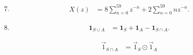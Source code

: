 \begin{enumerate}[label=\thesubsection.\arabic*, ref=\thesubsection.\theenumi, leftmargin=12mm, itemsep=4pt]
    \setcounter{enumi}{6}
    \item[\ref{question-short:C10-Q22}]
    \begin{align}
        X(z) &= 8\sum_{n=0}^{59} z^{-n}
        + 2\sum_{n=0}^{59} n z^{-n}.
        \label{formula:C10-Q22}
    \end{align}

    \setcounter{enumi}{7}
    \item[\ref{question-short:C10-Q28}]
    \begin{align}
        \mathbf 1_{S\cup A}
        &= \mathbf 1_S+\mathbf 1_A-\mathbf 1_{S\cap A}.
        \label{formula:C10-Q28}
    \end{align}

\begin{align}
    \vec{1}_{S\cap A}
    &= \vec{1}_S\odot\vec{1}_A
    \label{formula:C10-Q28-1}
\end{align}


\end{enumerate}
